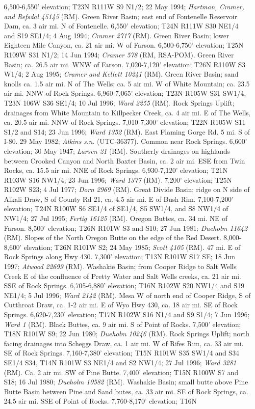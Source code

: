 6,500-6,550' elevation; T23N R111W S9 N1/2; 22 May 1994; \textit{Hartman, Cramer, and Refsdal 45145} (RM).  Green River Basin; east end of Fontenelle Reservoir Dam, ca. 3 air mi. N of Fontenelle. 6,550' elevation; T24N R111W S30 NE1/4 and S19 SE1/4; 4 Aug 1994; \textit{Cramer 2717} (RM).  Green River Basin; lower Eighteen Mile Canyon, ca. 21 air mi. W of Farson. 6,500-6,750' elevation; T25N R109W S31 N1/2; 14 Jun 1994; \textit{Cramer 578} (RM, RSA-POM).  Green River Basin; ca. 26.5 air mi. WNW of Farson. 7,020-7,120' elevation; T26N R110W S3 W1/4; 2 Aug 1995; \textit{Cramer and Kellett 10241} (RM).  Green River Basin; sand knolls ca. 1.5 air mi. N of The Wells; ca. 5 air mi. W of White Mountain; ca. 23.5 air mi. NNW of Rock Springs. 6,960-7,065' elevation; T23N R105W S31 SW1/4, T23N 106W S36 SE1/4; 10 Jul 1996; \textit{Ward 2255} (RM).  Rock Springs Uplift; drainages from White Mountain to Killpecker Creek, ca. 4 air mi. E of The Wells, ca. 20.5 air mi. NNW of Rock Springs. 7,010-7,300' elevation; T22N R105W S11 S1/2 and S14; 23 Jun 1996; \textit{Ward 1352} (RM).  East Flaming Gorge Rd. 5 mi. S of I-80. 29 May 1982; \textit{Atkins s.n.} (UTC-36377).  Common near Rock Springs. 6,600' elevation; 30 May 1947; \textit{Larsen 21} (RM).  Southerly drainages on highlands between Crooked Canyon and North Baxter Basin, ca. 2 air mi. ESE from Twin Rocks, ca. 15.5 air mi. NNE of Rock Springs. 6,930-7,120' elevation; T21N R103W S16 NW1/4; 23 Jun 1996; \textit{Ward 1377} (RM).  7,200' elevation; T25N R102W S23; 4 Jul 1977; \textit{Dorn 2969} (RM).  Great Divide Basin; ridge on N side of Alkali Draw, S of County Rd 21, ca. 4.5 air mi. E of Bush Rim. 7,100-7,200' elevation; T24N R100W S6 SE1/4 of SE1/4, S5 SW1/4, and S8 NW1/4 of NW1/4; 27 Jul 1995; \textit{Fertig 16125} (RM).  Oregon Buttes, ca. 34 mi. NE of Farson. 8,500' elevation; T26N R101W S3 and S10; 27 Jun 1981; \textit{Dueholm 11642} (RM).  Slopes of the North Oregon Butte on the edge of the Red Desert. 8,000-8,600' elevation; T26N R101W S2; 24 May 1985; \textit{Scott 4105} (RM).  47 mi. E of Rock Springs along Hwy 430.	7,300' elevation; T13N R101W S17 SE; 18 Jun 1997; \textit{Atwood 22699} (RM).  Washakie Basin; from Cooper Ridge to Salt Wells Creek E of the confluence of Pretty Water and Salt Wells creeks, ca. 21 air mi. SSE of Rock Springs. 6,705-6,880' elevation; T16N R102W S20 NW1/4 and S19 NE1/4; 5 Jul 1996; \textit{Ward 2142} (RM).  Mesa W of north end of Cooper Ridge, S of Cutthroat Draw, ca. 1-2 air mi. E of Wyo Hwy 430, ca. 18 air mi. SE of Rock Springs. 6,620-7,230' elevation; T17N R102W S16 N1/4 and S9 S1/4; 7 Jun 1996; \textit{Ward 1} (RM).  Black Buttes, ca. 9 air mi. S of Point of Rocks. 7,500' elevation; T18N R101W S9; 22 Jun 1980; \textit{Dueholm 10246} (RM).  Rock Springs Uplift; north facing drainages into Scheggs Draw, ca. 1 air mi. W of Rifes Rim, ca. 33 air mi. SE of Rock Springs. 7,160-7,380' elevation; T15N R101W S35 SW1/4 and S34 SE1/4 S34, T14N R101W S3 NE1/4 and S2 NW1/4; 27 Jul 1996; \textit{Ward 3281} (RM).  Ca. 2 air mi. SW of Pine Butte. 7,400' elevation; T15N R100W S7 and S18; 16 Jul 1980; \textit{Dueholm 10582} (RM).  Washakie Basin; small butte above Pine Butte Basin between Pine and Sand butes, ca. 33 air mi. SE of Rock Springs, ca. 24.5 air mi. SSE of Point of Rocks. 7,760-8,170' elevation; T16N 